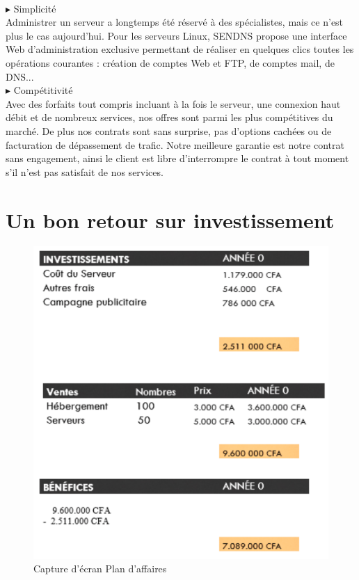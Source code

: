 \documentclass[a4paper, 12pt]{report}
\begin{document}
\\
\noindent $\blacktriangleright$ Simplicité 
\\
Administrer un serveur a longtemps été réservé à des spécialistes, mais ce n'est plus le cas aujourd'hui. Pour les serveurs Linux, SENDNS propose une interface Web d'administration exclusive permettant de réaliser en quelques clics toutes les opérations courantes : création de comptes Web et FTP, de comptes mail, de DNS... 
\\
\noindent $\blacktriangleright$ Compétitivité
\\
Avec des forfaits tout compris incluant à la fois le serveur, une connexion haut débit et de nombreux services, nos offres sont parmi les plus compétitives du marché. De plus nos contrats sont sans surprise, pas d'options cachées ou de facturation de dépassement de trafic. Notre meilleure garantie est notre contrat sans engagement, ainsi le client est libre d'interrompre le contrat à tout moment s’il n’est pas satisfait de nos services.
\section{Un bon retour sur investissement}	
\begin{figure}[H]
	\centering
	\includegraphics{img/bp}
	\caption{Capture d'écran Plan d'affaires}
	\label{Tux}
\end{figure}
\end{document}
